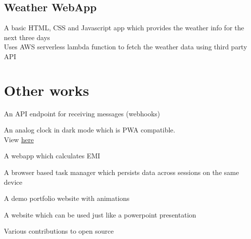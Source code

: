 \documentclass[]{deedy-resume-openfont}
\begin{document}
\begin{minipage}[t]{0.55\textwidth}
	\subsection{Weather WebApp}
	A basic HTML, CSS and Javascript app which provides the weather info for the next three days\\
	Uses AWS serverless lambda function to fetch the weather data using third party API
	\sectionsep

	\section{Other works}
	\sectionsep
	\begin{tightemize}
		\item An API endpoint for receiving messages (webhooks)
		\item An analog clock in dark mode which is PWA compatible.\\
		View {\href{https://analog-clock-dark.netlify.app/}{here}}
		\item A webapp which calculates EMI
		\item A browser based task manager which persists data across sessions on the same device
		\item A demo portfolio website with animations
		\item A website which can be used just like a powerpoint presentation
		\item Various contributions to open source
	\end{tightemize}


\end{minipage}
\hfill
\end{document}
